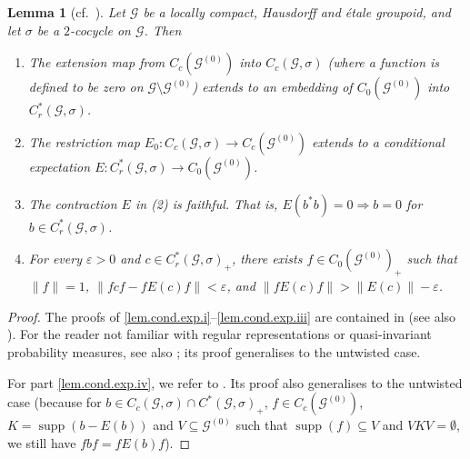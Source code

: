 \documentclass[a4paper, 12pt]{amsart}
\numberwithin{equation}{section}
\newcounter{theorem}
\newtheorem{lemma}[theorem]{Lemma}
\theoremstyle{remark}
\theoremstyle{definition}
\begin{document}
\begin{lemma}[cf.~\cite{MR584266}]\label{lem.cond.exp}
Let ${\mathcal{G}}$ be a locally compact, Hausdorff and \'etale groupoid, and let $\sigma$ be a
$2$-cocycle on ${\mathcal{G}}$. Then
\begin{enumerate}
\item\label{lem.cond.exp.i} The extension map from $C_c({\mathcal{G}}^{(0)})$ into $C_c({\mathcal{G}},\sigma)$ (where a
    function is defined to be zero on ${\mathcal{G}} \setminus  {\mathcal{G}}^{(0)}$) extends to an
    embedding of $C_0({\mathcal{G}}^{(0)})$ into $C^*_r({\mathcal{G}},\sigma)$.
\item\label{lem.cond.exp.ii}  The restriction map $E_0: C_c({\mathcal{G}},\sigma)\to C_c({\mathcal{G}}^{(0)})$ extends to a
    conditional expectation $E\colon  C^*_r({\mathcal{G}},\sigma)\to  C_0({\mathcal{G}}^{(0)})$.
\item\label{lem.cond.exp.iii}  The contraction $E$ in \emph{(2)} is faithful. That is,
    $E(b^*b)=0\Rightarrow b=0$ for $b\in C^*_r({\mathcal{G}},\sigma)$.
\item\label{lem.cond.exp.iv}  For every $\varepsilon > 0$ and $c \in C^*_r({\mathcal{G}},\sigma)_+$, there exists
    $f\in C_0({\mathcal{G}}^{(0)})_+$ such that $\|f\|=1$, $\|fcf-fE(c)f\|<\varepsilon$, and
    $\|fE(c)f\|>\|E(c)\|-\varepsilon$.
\end{enumerate}
\end{lemma}
\begin{proof}
The proofs of \eqref{lem.cond.exp.i}--\eqref{lem.cond.exp.iii} are contained in \cite{MR584266} (see also
\cite[note~\dag]{arxiv.1402.7126}). For the reader not familiar with regular
representations or quasi-invariant probability measures, see also
\cite[Lemma~2.1]{BroClaSie}; its proof generalises to the untwisted case.

For part \eqref{lem.cond.exp.iv}, we refer to \cite[Lemma~3.1]{BroClaSie}. Its proof also generalises to
the untwisted case (because for $b \in C_c({\mathcal{G}}, \sigma)\cap C^*({\mathcal{G}},\sigma)_+$, ${f\in
C_c({\mathcal{G}}^{(0)})}$, $K={\operatorname{supp}}(b-E(b))$ and $V\subseteq {\mathcal{G}}^{(0)}$ such that
${\operatorname{supp}}(f)\subseteq V$ and  $VKV=\emptyset$, we still have $fbf = fE(b)f$).
\end{proof}
\end{document}
